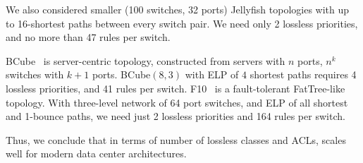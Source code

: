 We also considered smaller (100 switches, 32 ports) Jellyfish
topologies with up to 16-shortest paths between every switch pair. 
We need only 2 lossless priorities, and no more than 47 rules per switch.

BCube~\cite{bcube} is server-centric topology, constructed from servers with $n$
ports, $n^k$ switches with $k+1$ ports. BCube$(8,3)$ with ELP of $4$ shortest
paths requires 4 lossless priorities, and 41 rules per switch.
F10~\cite{f10} is a fault-tolerant FatTree-like topology.  With three-level
network of 64 port switches, and ELP of all shortest and 1-bounce paths, we need
just 2 lossless priorities and 164 rules per switch.

Thus, we conclude that in terms of number of lossless classes and ACLs,
\sysname{} scales well for modern data center architectures.

